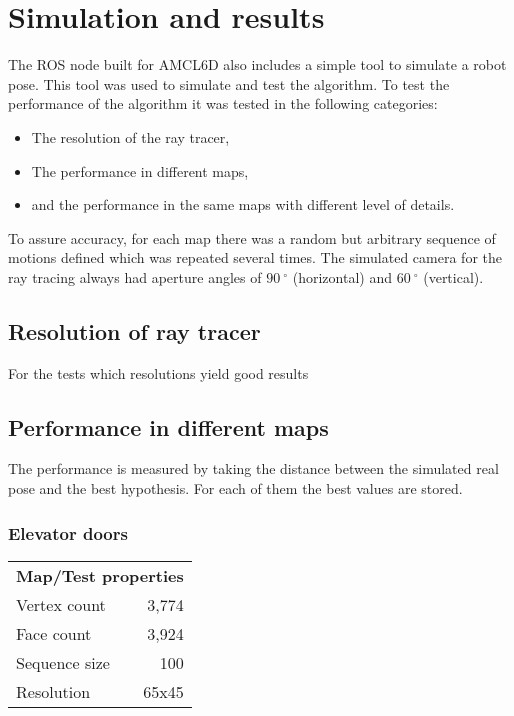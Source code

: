 \documentclass[Thesis.tex]{subfiles}
\begin{document}
\chapter{Simulation and results}

The \gls{ROS} node built for \gls{AMCL6D} also includes a simple tool to simulate a robot pose. This tool was used to simulate and test the algorithm.
To test the performance of the algorithm it was tested in the following categories:
\begin{itemize}
	\item The resolution of the ray tracer,
	\item The performance in different maps,
	\item and the performance in the same maps with different level of details.
\end{itemize}
To assure accuracy, for each map there was a random but arbitrary sequence of motions defined which was repeated several times. The simulated camera for the ray tracing always had aperture angles of $90{\ }^\circ$ (horizontal) and $60{\ }^\circ$ (vertical). 

\section{Resolution of ray tracer}
For the tests which resolutions yield good results


\section{Performance in different maps}
The performance is measured by taking the distance between the simulated real pose and the best hypothesis. For each of them the best values are stored.

\subsection{Elevator doors}
\begin{tabular}{lr}
  \multicolumn{2}{c}{\bf Map/Test properties} \\
	Vertex count & 3,774 \\
  Face count & 3,924 \\
  Sequence size & 100 \\
  Resolution & 65x45
\end{tabular}
\end{document}
